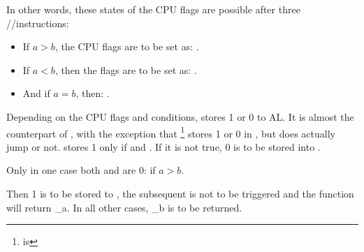 In other words, these states of the CPU flags are possible
after three \\
\FUCOMPP/\FNSTSW/\SAHF instructions:

\begin{itemize}
\item If $a>b$, the CPU flags are to be set as: .
\item If $a<b$, then the flags are to be set as: .
\item And if $a=b$, then: .
\end{itemize}


Depending on the CPU flags and conditions, \SETNBE stores 1 or 0 to AL. 
It is almost the counterpart of \JNBE, with the exception that \SETcc 
\footnote{ is } stores 1 or 0 in \AL, 
but \Jcc does actually jump or not. 
\SETNBE stores 1 only if  and . 
If it is not true, 0 is to be stored into \AL.

Only in one case both \CF and \ZF are 0: if $a>b$.

Then 1 is to be stored to \AL, the subsequent \JZ is not to be triggered and the function will return {\_a}. 
In all other cases, {\_b} is to be returned.


